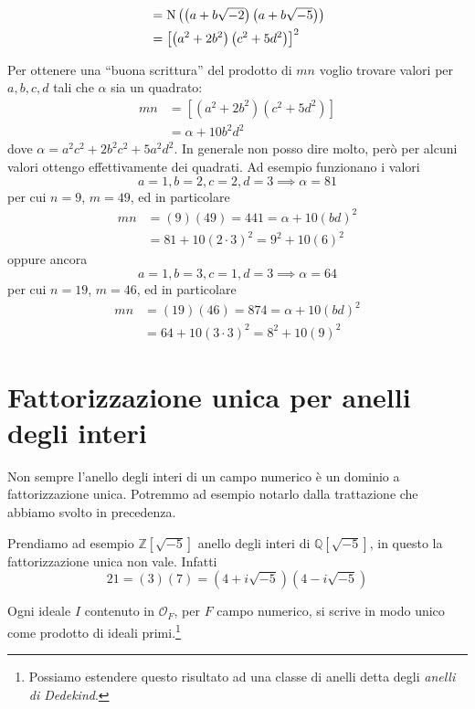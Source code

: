 \begin{esempio}
\begin{enumerate}
\begin{align*}
		&=\operatorname{N}\left(\left(a+b\sqrt{-2}\right)\left(a+b\sqrt{-5}\right)\right)\\
		&=\left[\left(a^2+2b^2\right)\left(c^2+5d^2\right)\right]^2
		\end{align*}
	\end{enumerate}
	Per ottenere una \enquote{buona scrittura} del prodotto di $mn$ voglio trovare valori per $a,b,c,d$ tali che $\alpha$ sia un quadrato:
	\begin{align*}
	mn&=\left[\left(a^2+2b^2\right)\left(c^2+5d^2\right)\right]\\
	&=\alpha+10b^2d^2
	\end{align*}
	dove $\alpha=a^2c^2+2b^2c^2+5a^2d^2$. In generale non posso dire molto, però per alcuni valori ottengo effettivamente dei quadrati. Ad esempio funzionano i valori
	\begin{equation*}
	a=1,b=2,c=2,d=3 \implies \alpha=81
	\end{equation*}
	per cui $n=9$, $m=49$, ed in particolare
	\begin{align*}
	mn&=(9)(49)=441=\alpha+10(bd)^2\\
	&=81+10(2\cdot3)^2=9^2+10(6)^2
	\end{align*}
	oppure ancora 
	\begin{equation*}
	a=1,b=3,c=1,d=3 \implies \alpha=64
	\end{equation*}
	per cui $n=19$, $m=46$, ed in particolare
	\begin{align*}
	mn&=(19)(46)=874=\alpha+10(bd)^2\\
	&=64+10(3\cdot3)^2=8^2+10(9)^2
	\end{align*}
\end{esempio}




\section{Fattorizzazione unica per anelli degli interi}
Non sempre l'anello degli interi di un campo numerico è un dominio a fattorizzazione unica. Potremmo ad esempio notarlo dalla trattazione che abbiamo svolto in precedenza.
\begin{esempio}
	Prendiamo ad esempio $\mathbb{Z}[\sqrt{-5}]$ anello degli interi di $\mathbb{Q}[\sqrt{-5}]$, in questo la fattorizzazione unica non vale. Infatti
	\begin{equation*}
	21=(3)(7)=\left(4+i\sqrt{-5}\right)\left(4-i\sqrt{-5}\right)
	\end{equation*}
\end{esempio}
\begin{teorema}
	Ogni ideale $I$ contenuto in $\mathcal{O}_F$, per $F$ campo numerico, si scrive in modo unico come prodotto di ideali primi.\footnote{Possiamo estendere questo risultato ad una classe di anelli detta degli \textit{anelli di Dedekind}.}
\end{teorema}




